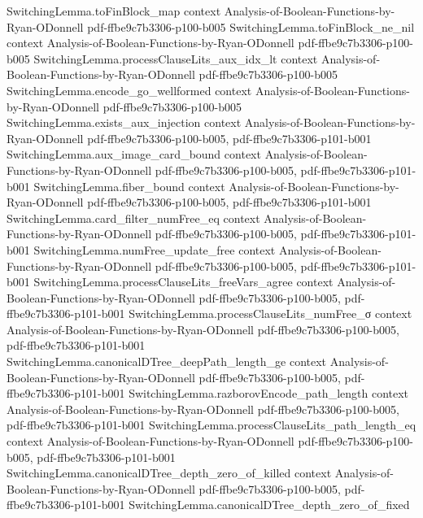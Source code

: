 \begin{theorem}
  {SwitchingLemma.toFinBlock_map}
  {context}
  {Analysis-of-Boolean-Functions-by-Ryan-ODonnell}
  {pdf-ffbe9c7b3306-p100-b005}
\proofstep
  {SwitchingLemma.toFinBlock_ne_nil}
  {context}
  {Analysis-of-Boolean-Functions-by-Ryan-ODonnell}
  {pdf-ffbe9c7b3306-p100-b005}
\proofstep
  {SwitchingLemma.processClauseLits_aux_idx_lt}
  {context}
  {Analysis-of-Boolean-Functions-by-Ryan-ODonnell}
  {pdf-ffbe9c7b3306-p100-b005}
\proofstep
  {SwitchingLemma.encode_go_wellformed}
  {context}
  {Analysis-of-Boolean-Functions-by-Ryan-ODonnell}
  {pdf-ffbe9c7b3306-p100-b005}
\proofstep
  {SwitchingLemma.exists_aux_injection}
  {context}
  {Analysis-of-Boolean-Functions-by-Ryan-ODonnell}
  {pdf-ffbe9c7b3306-p100-b005,
    pdf-ffbe9c7b3306-p101-b001}
\proofstep
  {SwitchingLemma.aux_image_card_bound}
  {context}
  {Analysis-of-Boolean-Functions-by-Ryan-ODonnell}
  {pdf-ffbe9c7b3306-p100-b005,
    pdf-ffbe9c7b3306-p101-b001}
\proofstep
  {SwitchingLemma.fiber_bound}
  {context}
  {Analysis-of-Boolean-Functions-by-Ryan-ODonnell}
  {pdf-ffbe9c7b3306-p100-b005,
    pdf-ffbe9c7b3306-p101-b001}
\proofstep
  {SwitchingLemma.card_filter_numFree_eq}
  {context}
  {Analysis-of-Boolean-Functions-by-Ryan-ODonnell}
  {pdf-ffbe9c7b3306-p100-b005,
    pdf-ffbe9c7b3306-p101-b001}
\proofstep
  {SwitchingLemma.numFree_update_free}
  {context}
  {Analysis-of-Boolean-Functions-by-Ryan-ODonnell}
  {pdf-ffbe9c7b3306-p100-b005,
    pdf-ffbe9c7b3306-p101-b001}
\proofstep
  {SwitchingLemma.processClauseLits_freeVars_agree}
  {context}
  {Analysis-of-Boolean-Functions-by-Ryan-ODonnell}
  {pdf-ffbe9c7b3306-p100-b005,
    pdf-ffbe9c7b3306-p101-b001}
\proofstep
  {SwitchingLemma.processClauseLits_numFree_σ}
  {context}
  {Analysis-of-Boolean-Functions-by-Ryan-ODonnell}
  {pdf-ffbe9c7b3306-p100-b005,
    pdf-ffbe9c7b3306-p101-b001}
\proofstep
  {SwitchingLemma.canonicalDTree_deepPath_length_ge}
  {context}
  {Analysis-of-Boolean-Functions-by-Ryan-ODonnell}
  {pdf-ffbe9c7b3306-p100-b005,
    pdf-ffbe9c7b3306-p101-b001}
\proofstep
  {SwitchingLemma.razborovEncode_path_length}
  {context}
  {Analysis-of-Boolean-Functions-by-Ryan-ODonnell}
  {pdf-ffbe9c7b3306-p100-b005,
    pdf-ffbe9c7b3306-p101-b001}
\proofstep
  {SwitchingLemma.processClauseLits_path_length_eq}
  {context}
  {Analysis-of-Boolean-Functions-by-Ryan-ODonnell}
  {pdf-ffbe9c7b3306-p100-b005,
    pdf-ffbe9c7b3306-p101-b001}
\proofstep
  {SwitchingLemma.canonicalDTree_depth_zero_of_killed}
  {context}
  {Analysis-of-Boolean-Functions-by-Ryan-ODonnell}
  {pdf-ffbe9c7b3306-p100-b005,
    pdf-ffbe9c7b3306-p101-b001}
\proofstep
  {SwitchingLemma.canonicalDTree_depth_zero_of_fixed}

\end{theorem}
